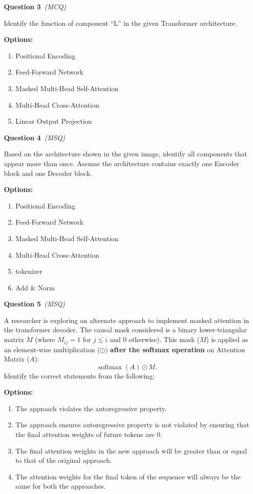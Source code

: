 \documentclass[11pt]{article}
\newcommand{\q}[2]{\vspace{0.5em}\noindent\textbf{Question #1}\if\relax\detokenize{#2}\relax\else\ \textit{(#2)}\fi\par}
\newcommand{\opts}{\textbf{Options:}}
\begin{document}
\q{3}{MCQ}
Identify the function of component ``L'' in the given Transformer architecture.

\opts
\begin{enumerate}[label=(\alph*)]
\item Positional Encoding
\item Feed-Forward Network
\item Masked Multi-Head Self-Attention
\item Multi-Head Cross-Attention
\item Linear Output Projection
\end{enumerate}

\q{4}{MSQ}
Based on the architecture shown in the given image, identify all components that appear more than once. Assume the architecture contains exactly one Encoder block and one Decoder block.

\opts
\begin{enumerate}[label=(\alph*)]
\item Positional Encoding
\item Feed-Forward Network
\item Masked Multi-Head Self-Attention
\item Multi-Head Cross-Attention
\item tokenizer
\item Add \& Norm
\end{enumerate}

\q{5}{MSQ}
A researcher is exploring an alternate approach to implement masked attention in the transformer decoder. The causal mask considered is a binary lower-triangular matrix $M$ (where $M_{ij}=1$ for $j\le i$ and 0 otherwise). This mask ($M$) is applied as an element-wise multiplication ($\odot$) \textbf{after the softmax operation} on Attention Matrix ($A$):
\[
\operatorname{softmax}(A)\odot M.
\]
Identify the correct statements from the following:

\opts
\begin{enumerate}[label=(\alph*)]
\item The approach violates the autoregressive property.
\item The approach ensures autoregressive property is not violated by ensuring that the final attention weights of future tokens are 0.
\item The final attention weights in the new approach will be greater than or equal to that of the original approach.
\item The attention weights for the final token of the sequence will always be the same for both the approaches.
\end{enumerate}
\end{document}
